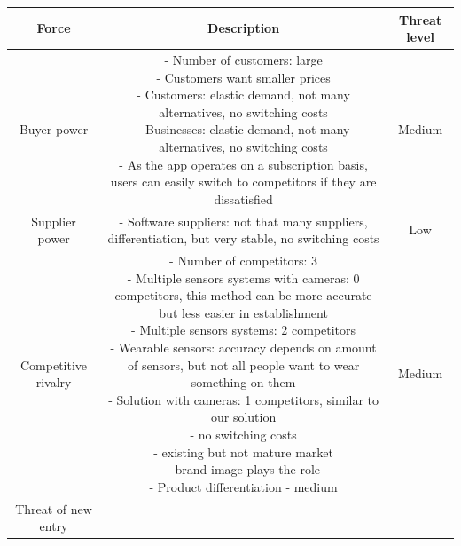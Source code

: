 \begin{table}[h]
    \centering
    \begin{tabular}{|c|c|c|}
        \hline
        \textbf{Force} & \textbf{Description} & \textbf{Threat level} \\
        \hline
        Buyer power &  \parbox{10cm}{\vspace{5pt}
            - Number of customers: large\\
            - Customers want smaller prices\\
            - Customers: elastic demand, not many alternatives, no switching costs\\
            - Businesses: elastic demand, not many alternatives, no switching costs\\
            - As the app operates on a subscription basis, users can easily switch to competitors if they are dissatisfied
            \vspace{5pt}} & Medium \\
    \hline
        Supplier power &  \parbox{10cm}{\vspace{5pt}
            -	Software suppliers: not that many suppliers, differentiation, but very stable, no switching costs
            \vspace{5pt}        
        } & Low \\
    \hline
        Competitive rivalry &  \parbox{10cm}{\vspace{5pt}
            -	Number of competitors: 3\\
            -	Multiple sensors systems with cameras: 0 competitors, this method can be more accurate but less easier in establishment\\
            -	Multiple sensors systems: 2 competitors\\
            -	Wearable sensors: accuracy depends on amount of sensors, but not all people want to wear something on them\\
            -	Solution with cameras: 1 competitors, similar to our solution\\
            -	no switching costs\\
            -	existing but not mature market\\
            -	brand image plays the role\\
            -	Product differentiation - medium
            \vspace{5pt}
            } & Medium \\
    \hline
        Threat of new entry &  \parbox{10cm}{\vspace{5pt}
}
\end{tabular}
\end{table}
